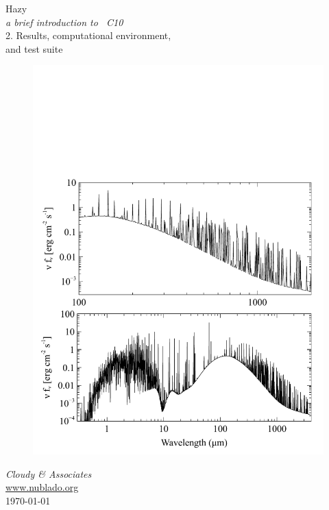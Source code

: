 \documentclass[12pt]{book}
\begin{document}
\frontmatter

\begin{titlepage}
\begin{center}

\Huge
Hazy\\
\Large
\emph{a brief introduction to \Cloudy\ C10}\\
\LARGE
2. Results, computational environment,\\
and test suite

\begin{figure}
\begin{center}
\includegraphics[clip=on,width=0.8\columnwidth,keepaspectratio]{Deep_crab}
\end{center}
\end{figure}

\vspace{15 mm }
\LARGE
\emph{Cloudy \& Associates} \\
\Large
\href{http://www.nublado.org}{www.nublado.org} \\
\normalsize
\today
\end{center}
\end{titlepage}
\end{document}
